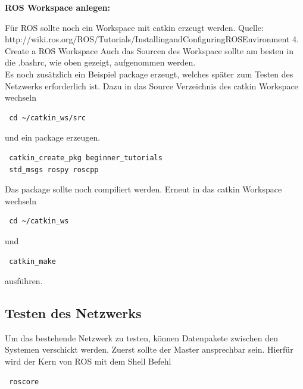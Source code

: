 \documentclass[12pt]{article}
\begin{document}
{\bf ROS Workspace anlegen:}

Für ROS sollte noch ein Workspace mit catkin erzeugt werden.
Quelle: http://wiki.ros.org/ROS/Tutorials/InstallingandConfiguringROSEnvironment
4. Create a ROS Workspace
Auch das Sourcen des Workspace sollte am besten in die .bashrc, wie oben gezeigt, aufgenommen werden. \\
Es noch zusätzlich ein Beispiel package erzeugt, welches später zum Testen des Netzwerks erforderlich ist.
Dazu in das Source Verzeichnis des catkin Workspace wechseln

 \begin{lstlisting}
 cd ~/catkin_ws/src
 \end{lstlisting}

und ein package erzeugen. 

 \begin{lstlisting}
 catkin_create_pkg beginner_tutorials
 std_msgs rospy roscpp
 \end{lstlisting}

Das package sollte noch compiliert werden.
Erneut in  das catkin Workspace wechseln

 \begin{lstlisting}
 cd ~/catkin_ws
 \end{lstlisting}

und  
 
 \begin{lstlisting}
 catkin_make
 \end{lstlisting}
 
ausführen.
\subsection{Testen des Netzwerks}

Um das bestehende Netzwerk zu testen, können Datenpakete zwischen den Systemen verschickt werden.
Zuerst sollte der Master ansprechbar sein.
Hierfür wird der Kern von ROS mit dem Shell Befehl 

 \begin{lstlisting}
 roscore
 \end{lstlisting}
\end{document}
